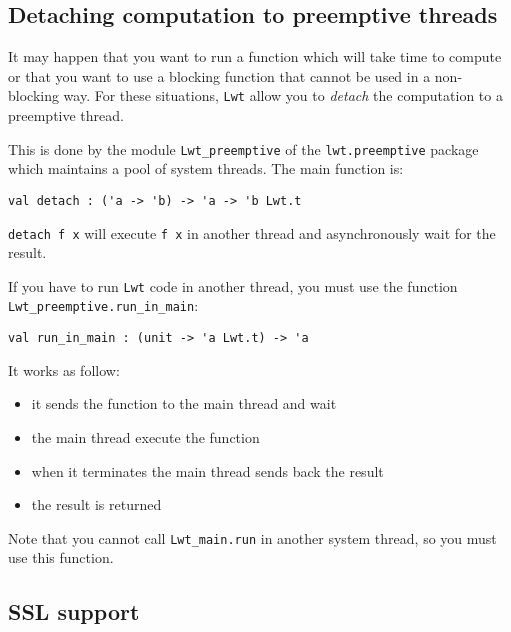 \subsection{ Detaching computation to preemptive threads }

It may happen that you want to run a function which will take time to
compute or that you want to use a blocking function that cannot be
used in a non-blocking way. For these situations, {\tt Lwt} allow you to
\emph{detach} the computation to a preemptive thread.



This is done by the module {\tt Lwt\_preemptive} of the
{\tt lwt.preemptive} package which maintains a pool of system
threads. The main function is:



\lstset{language=[Objective]Caml}\begin{lstlisting}
val detach : ('a -> 'b) -> 'a -> 'b Lwt.t
\end{lstlisting}
\medskip

\noindent
{\tt detach f x} will execute {\tt f x} in another thread and
asynchronously wait for the result.



If you have to run {\tt Lwt} code in another thread, you must use
the function {\tt Lwt\_preemptive.run\_in\_main}:



\lstset{language=[Objective]Caml}\begin{lstlisting}
val run_in_main : (unit -> 'a Lwt.t) -> 'a
\end{lstlisting}
\medskip

\noindent
It works as follow:



\begin{itemize}
\item  it sends the function to the main thread and wait
\item  the main thread execute the function
\item  when it terminates the main thread sends back the result
\item  the result is returned

\end{itemize}

Note that you cannot call {\tt Lwt\_main.run} in another system
thread, so you must use this function.



\subsection{ SSL support }

